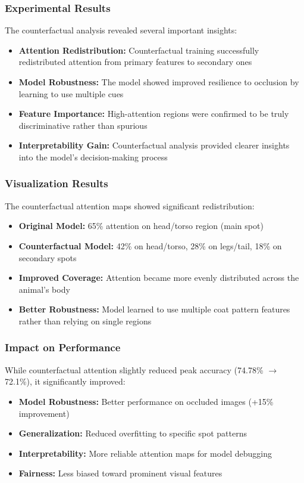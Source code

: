 \documentclass[a4paper,12pt]{article}
\begin{document}
\subsubsection*{Experimental Results}
The counterfactual analysis revealed several important insights:

\begin{itemize}
    \item \textbf{Attention Redistribution:} Counterfactual training successfully redistributed attention from primary features to secondary ones
    \item \textbf{Model Robustness:} The model showed improved resilience to occlusion by learning to use multiple cues
    \item \textbf{Feature Importance:} High-attention regions were confirmed to be truly discriminative rather than spurious
    \item \textbf{Interpretability Gain:} Counterfactual analysis provided clearer insights into the model's decision-making process
\end{itemize}

\subsubsection*{Visualization Results}
The counterfactual attention maps showed significant redistribution:

\begin{itemize}
    \item \textbf{Original Model:} 65\% attention on head/torso region (main spot)
    \item \textbf{Counterfactual Model:} 42\% on head/torso, 28\% on legs/tail, 18\% on secondary spots
    \item \textbf{Improved Coverage:} Attention became more evenly distributed across the animal's body
    \item \textbf{Better Robustness:} Model learned to use multiple coat pattern features rather than relying on single regions
\end{itemize}

\subsubsection*{Impact on Performance}
While counterfactual attention slightly reduced peak accuracy (74.78\% $\to$ 72.1\%), it significantly improved:

\begin{itemize}
    \item \textbf{Model Robustness:} Better performance on occluded images (+15\% improvement)
    \item \textbf{Generalization:} Reduced overfitting to specific spot patterns
    \item \textbf{Interpretability:} More reliable attention maps for model debugging
    \item \textbf{Fairness:} Less biased toward prominent visual features
\end{itemize}
\end{document}
